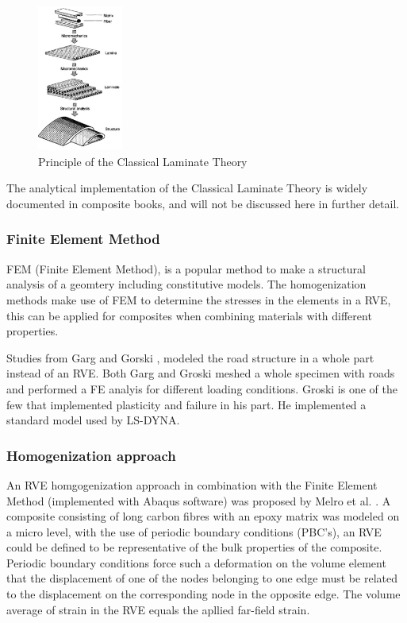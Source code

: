 \begin{figure}[H]
    \centering
    \includegraphics[width=0.25\textwidth]{chapter_2/figures/CompositeTheory.PNG}
    \caption{Principle of the Classical Laminate Theory \cite{Ishai2006EngineeringMaterials}}
    \label{fig:Transverseraster}
\end{figure}
The analytical implementation of the Classical Laminate Theory is widely documented in composite books, and will not be discussed here in further detail. 

\subsubsection{Finite Element Method}    
\label{FiniteElementMethod}
FEM (Finite Element Method), is a popular method to make a structural analysis of a geomtery including constitutive models. The homogenization methods make use of FEM to determine the stresses in the elements in a RVE, this can be applied for composites when combining materials with different properties.

Studies from Garg \cite{Garg2017AnStudy} and Gorski \cite{Gorski2015ComputationMethod}, modeled the road structure in a whole part instead of an RVE. Both Garg \cite{Garg2017AnStudy} and Groski meshed a whole  specimen with roads and performed a FE analyis for different loading conditions. Groski is one of the few that implemented plasticity and failure in his part. He implemented a standard model used by LS-DYNA.  


\subsubsection{Homogenization approach}
An RVE homgogenization approach in combination with the Finite Element Method (implemented with Abaqus software) was proposed by Melro et al. \cite{Melro2012InfluenceMaterials}. A composite consisting of long carbon fibres with an epoxy matrix was modeled on a micro level, with the use of periodic boundary conditions (PBC's), an RVE could be defined to be representative of the bulk properties of the composite. Periodic boundary conditions force such a deformation on the volume element that the displacement of one of the nodes belonging to one edge must be related to the displacement on the corresponding node in the opposite edge\cite{Melro2012InfluenceMaterials}. The volume average of strain in the RVE equals the apllied far-field strain.


